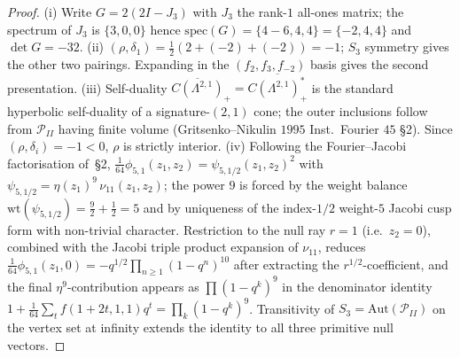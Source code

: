 \begin{proof}
(i) Write $G = 2(2 I - J_3)$ with $J_3$ the rank-$1$ all-ones matrix;
the spectrum of $J_3$ is $\{3, 0, 0\}$ hence
$\mathrm{spec}(G) = \{4 - 6, 4, 4\} = \{-2, 4, 4\}$ and
$\det G = -32$.
(ii) $(\rho, \delta_1) = \tfrac{1}{2}(2 + (-2) + (-2)) = -1$; $S_3$
symmetry gives the other two pairings. Expanding in the $(f_2, f_3, f_{-2})$
basis gives the second presentation.
(iii) Self-duality $\overline{C(\Lambda^{2,1})}_+ = \overline{C(\Lambda^{2,1})^*_+}$
is the standard hyperbolic self-duality of a signature-$(2,1)$ cone;
the outer inclusions follow from $\mathcal P_{II}$ having finite volume
(Gritsenko--Nikulin $1995$ Inst.\ Fourier $45$ \S 2).
Since $(\rho, \delta_i) = -1 < 0$, $\rho$ is strictly interior.
(iv) Following the Fourier--Jacobi factorisation of~\S 2,
$\tfrac{1}{64}\phi_{5,1}(z_1, z_2) = \psi_{5, 1/2}(z_1, z_2)^2$
with $\psi_{5, 1/2} = \eta(z_1)^9\, \nu_{11}(z_1, z_2)$; the power $9$
is forced by the weight balance $\mathrm{wt}(\psi_{5, 1/2}) =
\tfrac{9}{2} + \tfrac{1}{2} = 5$ and by uniqueness of the index-$1/2$
weight-$5$ Jacobi cusp form with non-trivial character.
Restriction to the null ray $r = 1$ (i.e.\ $z_2 = 0$), combined with the
Jacobi triple product expansion of $\nu_{11}$, reduces
$\tfrac{1}{64}\phi_{5,1}(z_1, 0) = -q^{1/2}\prod_{n\geq 1}(1-q^n)^{10}$
after extracting the $r^{1/2}$-coefficient, and the final
$\eta^{9}$-contribution appears as $\prod(1-q^k)^9$ in the
denominator identity $1 + \tfrac{1}{64}\sum_{t} f(1+2t, 1, 1) q^t
= \prod_k (1-q^k)^{9}$. Transitivity of $S_3 = \mathrm{Aut}(\mathcal P_{II})$
on the vertex set at infinity extends the identity to all three
primitive null vectors.
\end{proof}

